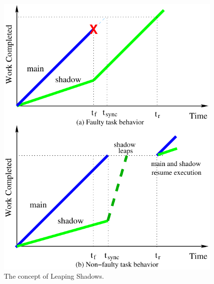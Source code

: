 \begin{figure}[!t]
	\begin{center}
			\includegraphics[width=\columnwidth]{Figures/jump.pdf}
	\end{center}
	\caption{The concept of Leaping Shadows.}
	\label{fig:leap}
\end{figure}

